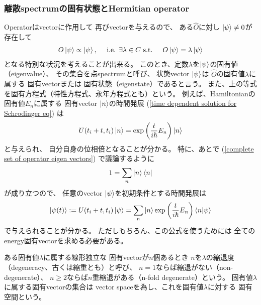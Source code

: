\subsubsection{離散spectrumの固有状態とHermitian operator}

Operatorはvectorに作用して
再びvectorを与えるので、
ある$\hat{O}$に対し
$\ket{\psi} \neq 0$が存在して
\begin{align}
    O\ket{\psi} \propto \ket{\psi}
,\quad\text{
    i.e.
    $\exists \lambda\in C$
    s.t.
}\quad
    O\ket{\psi} = \lambda \ket{\psi}
\end{align}
となる特別な状況を考えることが出来る。
このとき、定数$\lambda$を$\ket{\psi}$の固有値（eigenvalue）、
その集合を点spectrumと呼び、
状態vector $\ket{\psi}$は
$\hat{O}$の固有値$\lambda$に属する
固有vectorまたは
固有状態（eigenstate）であると言う。
また、上の等式を固有方程式（特性方程式、永年方程式とも）という。
例えば、Hamiltonianの固有値$E_n$に属する
固有vector $\ket{n}$の時間発展
(\ref{time dependent solution for Schrodinger eq})
は
\begin{align}
    U(t_i + t, t_i) \ket{n}
    =
    \exp\left(
        \dfrac{t}{i\hbar} E_n
    \right)
    \ket{n}
\end{align}
と与えられ、
自分自身の位相倍となることが分かる。
特に、あとで
(\ref{complete set of operator eigen vectors})
で議論するように
\begin{align}
    1 = \sum_n \ket{n} \bra{n}
\end{align}
が成り立つので、
任意のvector $\ket{\psi}$を初期条件とする時間発展は
\begin{align}
    \ket{\psi(t)}
    :=
    U(t_i + t, t_i)
    \ket{\psi}
    =
    \sum_n \ket{n}
    \exp\left(
        \dfrac{t}{i\hbar} E_n
    \right)
    \braket{ n | \psi }
\label{eigen decomposition of time independent solution}
\end{align}
で与えられることが分かる。
ただしもちろん、この公式を使うためには
全てのenergy固有vectorを求める必要がある。

ある固有値$\lambda$に属する線形独立な
固有vectorが$n$個あるとき
$n$を$\lambda$の縮退度（degeneracy、古くは縮重とも）と呼び、
$n = 1$ならば縮退がない（non-degenerate）、
$n \ge 2$ならば$n$重縮退がある（n-fold degenerate）という。
固有値$\lambda$に属する固有vectorの集合は
vector spaceを為し、これを固有値$\lambda$に対する
固有空間という。


